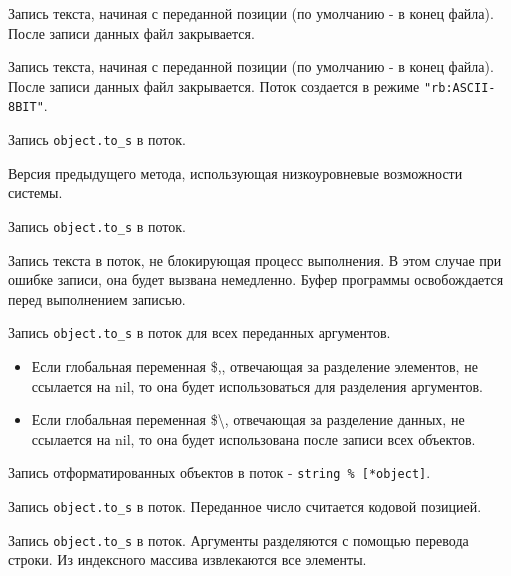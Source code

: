 \begin{methodlist}
  Запись текста, начиная с переданной позиции (по умолчанию - в конец файла). После записи данных файл закрывается.

  Запись текста, начиная с переданной позиции (по умолчанию - в конец файла). После записи данных файл закрывается. Поток создается в режиме \verb!"rb:ASCII-8BIT"!.

  Запись \verb!object.to_s! в поток. 

  Версия предыдущего метода, использующая низкоуровневые возможности системы.
 
  Запись \verb!object.to_s! в поток. 
 
  Запись текста в поток, не блокирующая процесс выполнения. В этом случае при ошибке записи, она будет вызвана немедленно. Буфер программы освобождается перед выполнением записью.    

  Запись \verb!object.to_s! в поток для всех переданных аргументов.
  \begin{itemize}
    \item Если глобальная переменная \$,, отвечающая за разделение элементов, не ссылается на nil, то она будет использоваться для разделения аргументов. 
    \item Если глобальная переменная \$\textbackslash, отвечающая за разделение данных, не ссылается на nil, то она будет использована после записи всех объектов. 
  \end{itemize}
 
  Запись отформатированных объектов в поток - \verb!string % [*object]!. 
   
  Запись \verb!object.to_s! в поток. Переданное число считается кодовой позицией.
 
  Запись \verb!object.to_s! в поток. Аргументы разделяются с помощью перевода строки. Из индексного массива извлекаются все элементы.
\end{methodlist}

